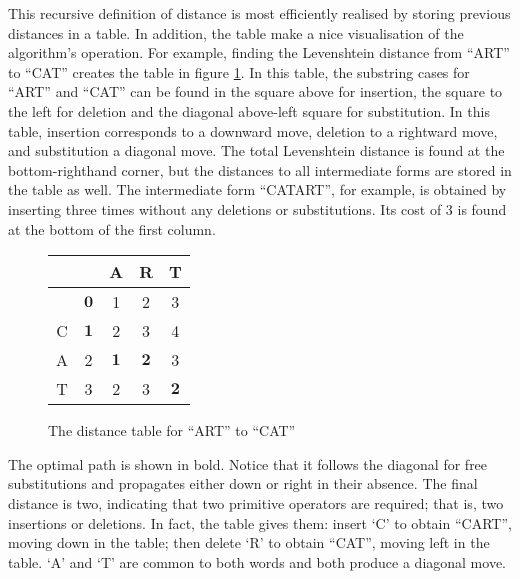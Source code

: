 \documentclass[11pt]{article}
\begin{document}
This recursive definition of distance is most efficiently realised by
storing previous distances in a table. In addition, the table make a
nice visualisation of the algorithm's operation.
For example, finding
the Levenshtein distance from ``ART''
to ``CAT'' creates the table in figure \ref{art2cattable}. In this
table, the substring cases for ``ART'' and ``CAT'' can be found in the
square above for insertion, the square to the left for deletion and
the diagonal above-left square for substitution.
In this
table, insertion corresponds to a downward move, deletion to a
rightward move, and substitution a diagonal move. The total
Levenshtein distance is found at the bottom-righthand corner, but the
distances to all intermediate forms are stored in the table as
well. The intermediate form ``CATART'', for example, is obtained by
inserting three times without any deletions or substitutions. Its
cost of 3 is found at the bottom of the first column.

\begin{figure}
\caption{The distance table for ``ART'' to ``CAT''}

\begin{center}
\begin{tabular}{c|c|c|c|c}
  &   & A & R & T \\
\hline
  & $\mathbf{0}$ & 1 & 2 & 3 \\
\hline
C & $\mathbf{1}$ & 2 & 3 & 4 \\
\hline
A & 2 & $\mathbf{1}$ & $\mathbf{2}$ & 3 \\
\hline
T & 3 & 2 & 3 & $\mathbf{2}$
\end{tabular}

\end{center}

\label{art2cattable}
\end{figure}

The optimal path is shown in bold. Notice that it
follows the diagonal for free substitutions and propagates either down or right
in their absence. The final distance is two, indicating that two
primitive operators are required; that is, two insertions or deletions.
In fact, the table gives
them: insert `C' to obtain ``CART'', moving down in the table; then
delete `R' to obtain ``CAT'', moving left in the table. `A' and `T'
are common to both words and both produce a diagonal move.

\end{document}
